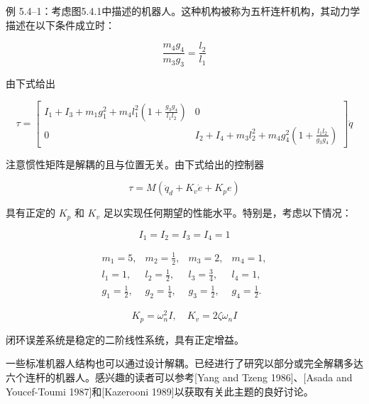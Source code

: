 \documentclass[UTF8,12pt,a4paper]{ctexart}
\begin{document}
\begin{example}[解耦设计]
例 5.4--1：考虑图5.4.1中描述的机器人。这种机构被称为五杆连杆机构，其动力学描述在以下条件成立时：

\begin{equation*}
\frac{m_4 g_4}{m_3 g_3} = \frac{l_2}{l_1}
\end{equation*}

由下式给出

\begin{equation*}
\tau = \begin{bmatrix} I_1 + I_3 + m_1 g_1^2 + m_4 l_1^2 \left(1 + \frac{g_3 g_4}{l_1 l_2}\right) & 0 \\ 0 & I_2 + I_4 + m_3 l_2^2 + m_4 g_4^2 \left(1 + \frac{l_1 l_2}{g_3 g_4}\right) \end{bmatrix} \ddot{q}
\end{equation*}

注意惯性矩阵是解耦的且与位置无关。由下式给出的控制器

\begin{equation*}
\tau = M(\ddot{q}_d + K_v \dot{e} + K_p e)
\end{equation*}

具有正定的 $K_p$ 和 $K_v$ 足以实现任何期望的性能水平。特别是，考虑以下情况：

\begin{equation*}
I_1 = I_2 = I_3 = I_4 = 1
\end{equation*}

\begin{equation*}
\begin{array}{llll}
m_1 = 5, & m_2 = \frac{1}{2}, & m_3 = 2, & m_4 = 1, \\
l_1 = 1, & l_2 = \frac{1}{2}, & l_3 = \frac{3}{4}, & l_4 = 1, \\
g_1 = \frac{1}{2}, & g_2 = \frac{1}{4}, & g_3 = \frac{1}{2}, & g_4 = \frac{1}{2}.
\end{array}
\end{equation*}

\begin{equation*}
K_p = \omega_n^2 I, \quad K_v = 2\zeta\omega_n I
\end{equation*}

闭环误差系统是稳定的二阶线性系统，具有正定增益。
\end{example}

一些标准机器人结构也可以通过设计解耦。已经进行了研究以部分或完全解耦多达六个连杆的机器人。感兴趣的读者可以参考[Yang and Tzeng 1986]、[Asada and Youcef-Toumi 1987]和[Kazerooni 1989]以获取有关此主题的良好讨论。
\end{document}
